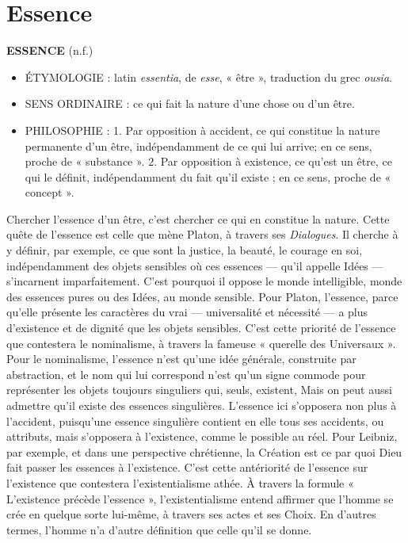 
\chapter{Essence}

{\bf E{\footnotesize SSENCE}} (n.f.)

\begin{itemize}[leftmargin=1cm, label=, itemsep=1pt]
\item {\footnotesize ÉTYMOLOGIE} : latin {\it essentia}, de
{\it esse}, « être », traduction du grec {\it ousia}.
\item {\footnotesize SENS ORDINAIRE} : ce qui fait
la nature d’une chose ou d’un être.
\item {\footnotesize PHILOSOPHIE} : 1. Par opposition à
accident, ce qui constitue la nature
permanente d’un être, indépendamment de ce qui lui arrive; en ce
sens, proche de « substance ». 2. Par
opposition à existence, ce qu'est un
être, ce qui le définit, indépendamment du fait qu'il existe ; en ce sens,
proche de « concept ».
\end{itemize}

Chercher l'essence d'un être, c’est chercher ce qui en constitue la nature. Cette
quête de l'essence est celle que mène
Platon, à travers ses {\it Dialogues}. Il
cherche à y définir, par exemple, ce que
sont la justice, la beauté, le courage en
soi, indépendamment des objets sensibles où ces essences — qu'il appelle
Idées — s'incarnent imparfaitement.
C’est pourquoi il oppose le monde intelligible, monde des essences pures ou
des Idées, au monde sensible. Pour Platon, l'essence, parce qu'elle présente les
caractères du vrai — universalité et
nécessité — a plus d'existence et de
dignité que les objets sensibles. C'est
cette priorité de l'essence que contestera
le nominalisme, à travers la fameuse
« querelle des Universaux ». Pour le
nominalisme, l'essence n’est qu’une idée
générale, construite par abstraction, et le
nom qui lui correspond n'est qu'un
signe commode pour représenter les
objets toujours singuliers qui, seuls,
existent, Mais on peut aussi admettre
qu'il existe des essences singulières.
L'essence ici s'opposera non plus à
l'accident, puisqu'une essence singulière contient en elle tous ses accidents,
ou attributs, mais s'opposera à l'existence, comme le possible au réel. Pour
Leibniz, par exemple, et dans une perspective chrétienne, la Création est ce
par quoi Dieu fait passer les essences à
l'existence. C'est cette antériorité de
l'essence sur l'existence que contestera
l’existentialisme athée. À travers la formule « L'existence précède l'essence »,
l'existentialisme entend affirmer que
l'homme se crée en quelque sorte lui-même, à travers ses actes et ses Choix.
En d’autres termes, l'homme n'a d'autre
définition que celle qu'il se donne.


